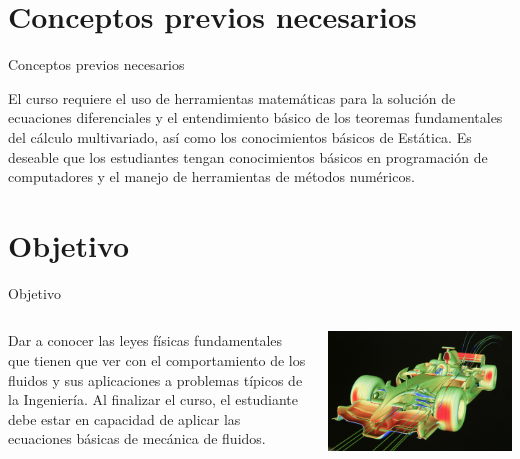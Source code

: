 \documentclass [xcolor=svgnames, t] {beamer}
\begin{document}
\section{Conceptos previos necesarios}
\begin{frame}{Conceptos previos necesarios}
\begin{exampleblock}{}
El curso requiere el uso de herramientas matemáticas para la solución de \alert{ecuaciones diferenciales} y el entendimiento básico de los teoremas fundamentales del \alert{cálculo multivariado}, así como los conocimientos básicos de Estática. Es deseable que los estudiantes tengan conocimientos básicos en programación de computadores y el manejo de herramientas de métodos numéricos.
\end{exampleblock}
\end{frame}

\section{Objetivo}
\begin{frame}{Objetivo}
\begin{columns}
\begin{exampleblock}{}
Dar a conocer las \alert{leyes físicas fundamentales} que tienen que ver con el comportamiento de los fluidos y sus aplicaciones a \alert{problemas típicos de la Ingeniería}. Al finalizar el curso, el estudiante debe estar en capacidad de aplicar las ecuaciones básicas de mecánica de fluidos.
\end{exampleblock}
\begin{center}
\includegraphics[width=\textwidth]{fmo1}
\end{center}
\end{columns}
\end{frame}
\end{document}
